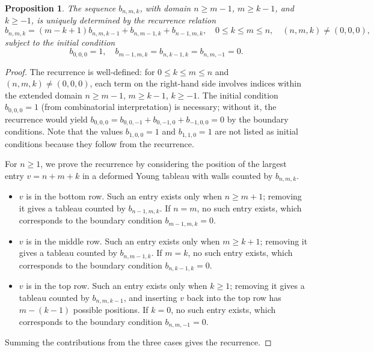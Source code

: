 \documentclass[reqno, 12pt]{article}
\newtheorem{prop}[thm]{Proposition}
\theoremstyle{mydefinition}
\theoremstyle{myremark}
\numberwithin{algorithm}{section}
\begin{document}
\begin{prop}\label{Definition-bnk-Proposition}
The sequence $b_{n,m,k}$, with domain $n\ge m-1$, $m\ge k-1$, and $k\ge -1$, is uniquely determined by the recurrence relation
\begin{equation}\label{rec:bnmk}
b_{n,m,k}=(m-k+1)b_{n,m,k-1} + b_{n,m-1,k} + b_{n-1,m,k}, \quad 0\le k\le m\le n,\quad (n,m,k)\neq (0,0,0),
\end{equation}
subject to the initial condition
$$
b_{0,0,0}=1,\quad b_{m-1,m,k}=b_{n,k-1,k}=b_{n,m,-1}=0.
$$
\end{prop}
\begin{proof}
The recurrence is well-defined: for $0\le k\le m\le n$ and $(n,m,k)\neq (0,0,0)$, each term on the right-hand side involves indices within the extended domain $n\ge m-1$, $m\ge k-1$, $k\ge -1$. The initial condition $b_{0,0,0}=1$ (from combinatorial interpretation) is necessary; without it, the recurrence would yield $b_{0,0,0}=b_{0,0,-1}+b_{0,-1,0}+b_{-1,0,0}=0$ by the boundary conditions. Note that the values $b_{1,0,0}=1$ and $b_{1,1,0}=1$ are not listed
as initial conditions because they follow from the recurrence.

For $n\ge 1$, we prove the recurrence by considering the position of the largest entry \(v=n+m+k\) in a deformed Young tableau with walls counted by \(b_{n,m,k}\).
\begin{itemize}
\item[(Case 1)] \(v\) is in the bottom row. Such an entry exists only when \(n\ge m+1\); removing it gives a tableau counted by \(b_{n-1,m,k}\). If \(n=m\), no such entry exists, which corresponds to the boundary condition \(b_{m-1,m,k}=0\).

\item[(Case 2)] \(v\) is in the middle row. Such an entry exists only when \(m\ge k+1\); removing it gives a tableau counted by \(b_{n,m-1,k}\). If \(m=k\), no such entry exists, which corresponds to the boundary condition \(b_{n,k-1,k}=0\).

\item[(Case 3)] \(v\) is in the top row. Such an entry exists only when \(k\ge 1\); removing it gives a tableau counted by $b_{n,m,k-1}$, and inserting $v$ back into the top row has $m-(k-1)$ possible positions. If $k=0$, no such entry exists, which corresponds to the boundary condition \(b_{n,m,-1}=0\).
\end{itemize}
Summing the contributions from the three cases gives the recurrence.
\end{proof}
\end{document}
